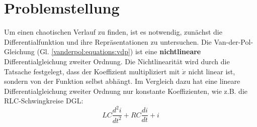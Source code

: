 %
%
%
\section{Problemstellung
\label{vanderpol:section:problemstellung}}
Um einen chaotischen Verlauf zu finden, ist es notwendig, zunächst die Differentialfunktion und ihre Repräsentationen zu untersuchen.
Die Van-der-Pol-Gleichung (Gl. \ref{vanderpol:equations:vdp}) ist eine \textbf{nichtlineare} Differentialgleichung zweiter Ordnung. 
Die Nichtlinearität wird durch die Tatsache festgelegt, dass der Koeffizient multipliziert mit $\dot{x}$ nicht linear ist, sondern von der Funktion selbst abhängt.
Im Vergleich dazu hat eine lineare Differentialgleichung zweiter Ordnung nur konstante Koeffizienten, wie z.B. die RLC-Schwingkreise DGL:
\begin{equation*}
	LC \frac{d^{2} i}{d t^{2}}+RC \frac{d i}{d t}+i
\end{equation*}

